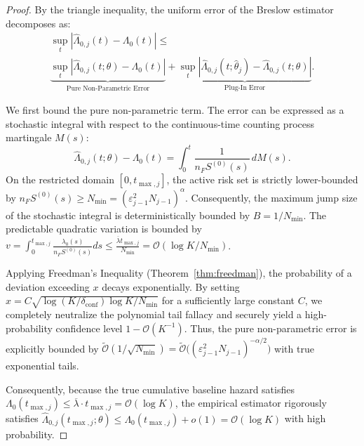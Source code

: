 \documentclass[letterpaper, 10 pt, conference]{IEEEconf}
\newcommand{\what}[1]{\widehat{#1}}
\begin{document}
\begin{proof}
    By the triangle inequality, the uniform error of the Breslow estimator decomposes as:
    \begin{multline}
        \sup_t |\what{\Lambda}_{0,j}(t) - \Lambda_0(t)| \le \\
        \underbrace{\sup_t |\what{\Lambda}_{0,j}(t; \theta) - \Lambda_0(t)|}_{\text{Pure Non-Parametric Error}} + \underbrace{\sup_t |\what{\Lambda}_{0,j}(t; \what{\theta}_j) - \what{\Lambda}_{0,j}(t; \theta)|}_{\text{Plug-In Error}}.
    \end{multline}

    We first bound the pure non-parametric term. The error can be expressed as a stochastic integral with respect to the continuous-time counting process martingale $M(s)$:
    \begin{equation}
        \what{\Lambda}_{0,j}(t; \theta) - \Lambda_0(t) = \int_0^t \frac{1}{n_F S^{(0)}(s)} \, dM(s).
    \end{equation}
    On the restricted domain $[0, t_{\max,j}]$, the active risk set is strictly lower-bounded by $n_F S^{(0)}(s) \ge N_{\min} = (\varepsilon_{j-1}^2 N_{j-1})^{\alpha}$. Consequently, the maximum jump size of the stochastic integral is deterministically bounded by $B = 1/N_{\min}$. The predictable quadratic variation is bounded by $v = \int_0^{t_{\max,j}} \frac{\lambda_0(s)}{n_F S^{(0)}(s)} ds \le \frac{\overline{\lambda} t_{\max,j}}{N_{\min}} = \mathcal{O}(\log K / N_{\min})$.

    Applying Freedman's Inequality (Theorem~\ref{thm:freedman}), the probability of a deviation exceeding $x$ decays exponentially. By setting $x = C \sqrt{\log(K/\delta_{\mathrm{conf}}) \log K / N_{\min}}$ for a sufficiently large constant $C$, we completely neutralize the polynomial tail fallacy and securely yield a high-probability confidence level $1 - \mathcal{O}(K^{-1})$. Thus, the pure non-parametric error is explicitly bounded by $\widetilde{\mathcal{O}}(1/\sqrt{N_{\min}}) = \widetilde{\mathcal{O}}\big((\varepsilon_{j-1}^2 N_{j-1})^{-\alpha/2}\big)$ with true exponential tails.

    Consequently, because the true cumulative baseline hazard satisfies $\Lambda_0(t_{\max,j}) \le \overline{\lambda} \cdot t_{\max,j} = \mathcal{O}(\log K)$, the empirical estimator rigorously satisfies $\what{\Lambda}_{0,j}(t_{\max,j}; \theta) \le \Lambda_0(t_{\max,j}) + o(1) = \mathcal{O}(\log K)$ with high probability.


\end{proof}
\end{document}
